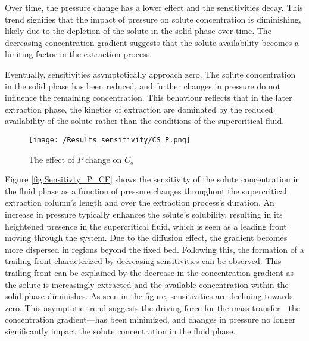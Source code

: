 \documentclass[../Article_Sensitivity_Analsysis.tex]{subfiles}
\begin{document}
    Over time, the pressure change has a lower effect and the sensitivities decay. This trend signifies that the impact of pressure on solute concentration is diminishing, likely due to the depletion of the solute in the solid phase over time. The decreasing concentration gradient suggests that the solute availability becomes a limiting factor in the extraction process.
    
    Eventually, sensitivities asymptotically approach zero. The solute concentration in the solid phase has been reduced, and further changes in pressure do not influence the remaining concentration. This behaviour reflects that in the later extraction phase, the kinetics of extraction are dominated by the reduced availability of the solute rather than the conditions of the supercritical fluid.


	\begin{figure}[h!]
		\centering
		\texttt{[image: /Results\_sensitivity/CS\_P.png]}
		\caption{The effect of $P$ change on $C_s$}
		\label{fig:Sensitivty_P_CS}
	\end{figure}

	Figure \ref{fig:Sensitivty_P_CF} shows the sensitivity of the solute concentration in the fluid phase as a function of pressure changes throughout the supercritical extraction column's length and over the extraction process's duration. An increase in pressure typically enhances the solute's solubility, resulting in its heightened presence in the supercritical fluid, which is seen as a leading front moving through the system. Due to the diffusion effect, the gradient becomes more dispersed in regions beyond the fixed bed. Following this, the formation of a trailing front characterized by decreasing sensitivities can be observed. This trailing front can be explained by the decrease in the concentration gradient as the solute is increasingly extracted and the available concentration within the solid phase diminishes. As seen in the figure, sensitivities are declining towards zero. This asymptotic trend suggests the driving force for the mass transfer—the concentration gradient—has been minimized, and changes in pressure no longer significantly impact the solute concentration in the fluid phase.
\end{document}
